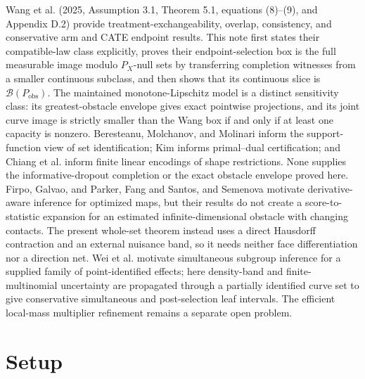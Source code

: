 \documentclass{article}
\begin{document}
Wang et al. (2025, Assumption 3.1, Theorem 5.1, equations (8)--(9), and Appendix D.2) provide treatment-exchangeability, overlap, consistency, and conservative arm and CATE endpoint results. This note first states their compatible-law class explicitly, proves their endpoint-selection box is the full measurable image modulo \(P_X\)-null sets by transferring completion witnesses from a smaller continuous subclass, and then shows that its continuous slice is \(\mathcal B(P_{\mathrm{obs}})\). The maintained monotone-Lipschitz model is a distinct sensitivity class: its greatest-obstacle envelope gives exact pointwise projections, and its joint curve image is strictly smaller than the Wang box if and only if at least one capacity is nonzero. Beresteanu, Molchanov, and Molinari inform the support-function view of set identification; Kim informs primal--dual certification; and Chiang et al. inform finite linear encodings of shape restrictions. None supplies the informative-dropout completion or the exact obstacle envelope proved here. Firpo, Galvao, and Parker, Fang and Santos, and Semenova motivate derivative-aware inference for optimized maps, but their results do not create a score-to-statistic expansion for an estimated infinite-dimensional obstacle with changing contacts. The present whole-set theorem instead uses a direct Hausdorff contraction and an external nuisance band, so it needs neither face differentiation nor a direction net. Wei et al. motivate simultaneous subgroup inference for a supplied family of point-identified effects; here density-band and finite-multinomial uncertainty are propagated through a partially identified curve set to give conservative simultaneous and post-selection leaf intervals. The efficient local-mass multiplier refinement remains a separate open problem.

\section{Setup}
\end{document}
